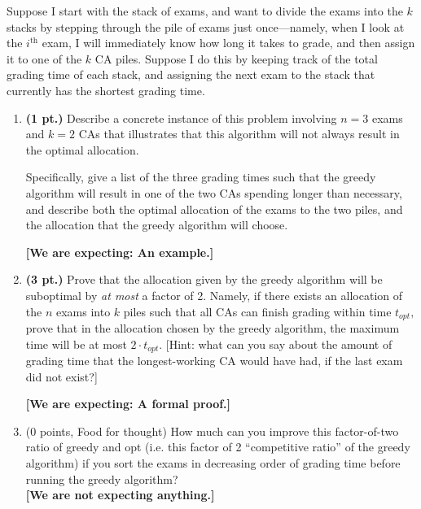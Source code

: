 \documentclass{article}
\begin{document}
\begin{enumerate}
    Suppose I start with the stack of exams, and want to divide the exams into
    the $k$ stacks by stepping through the pile of exams just once---namely,
    when I look at the $i^{\text{th}}$ exam, I will immediately know how long
    it takes to grade, and then assign it to one of the $k$ CA piles. Suppose I
    do this by keeping track of the total grading time of each stack, and
    assigning the next exam to the stack that currently has the shortest
    grading time.
    \begin{enumerate}
      \item \textbf{(1 pt.)} Describe a concrete instance of this problem
        involving $n=3$ exams and $k=2$ CAs that illustrates that this
        algorithm will not always result in the optimal allocation.

        Specifically, give a list of the three grading times such that the
        greedy algorithm will result in one of the two CAs spending longer than
        necessary, and describe both the optimal allocation of the exams to the
        two piles, and the allocation that the greedy algorithm will choose.

        \textbf{[We are expecting: An example.]}
      \item \textbf{(3 pt.)} Prove that the allocation given by the greedy
        algorithm will be suboptimal by \emph{at most} a factor of 2. Namely,
        if there exists an allocation of the $n$ exams into $k$ piles such that
        all CAs can finish grading within time $t_{opt},$ prove that in the
        allocation chosen by the greedy algorithm, the maximum time will be at
        most $2\cdot t_{opt}.$ [Hint: what can you say about the amount of
        grading time that the longest-working CA would have had, if the last
        exam did not exist?]

        \textbf{[We are expecting: A formal proof.]}
\item (0 points, Food for thought) How much can you improve this factor-of-two ratio of greedy and opt (i.e. this factor of 2 ``competitive ratio'' of the greedy algorithm) if you sort the exams in decreasing order of grading time before running the greedy algorithm?\\
\textbf{[We are not expecting anything.]}
\end{enumerate}
\end{enumerate}
\end{document}
